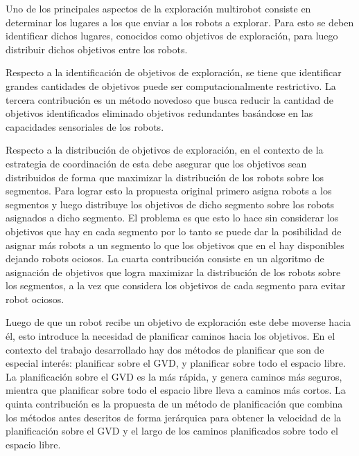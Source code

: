 Uno de los principales aspectos de la exploración multirobot consiste en
determinar los lugares a los que enviar a los robots a explorar. Para esto se
deben identificar dichos lugares, conocidos como objetivos de exploración, para
luego distribuir dichos objetivos entre los robots.

Respecto a la identificación de objetivos de exploración, se tiene que
identificar grandes cantidades de objetivos puede ser computacionalmente
restrictivo. La tercera contribución es un método novedoso que busca reducir la
cantidad de objetivos identificados eliminado objetivos redundantes basándose en
las capacidades sensoriales de los robots. 

Respecto a la distribución de objetivos de exploración, en el contexto de la
estrategia de coordinación de \cite{wurm2008coordinated} esta debe asegurar que
los objetivos sean distribuidos de forma que maximizar la distribución de los
robots sobre los segmentos. Para lograr esto la propuesta original primero
asigna robots a los segmentos y luego distribuye los objetivos de dicho segmento
sobre los robots asignados a dicho segmento. El problema es que esto lo hace sin
considerar los objetivos que hay en cada segmento por lo tanto se puede dar la
posibilidad de asignar más robots a un segmento lo que los objetivos que en el
hay disponibles dejando robots  ociosos. La cuarta contribución consiste en un
algoritmo de asignación de objetivos que logra maximizar la distribución de los
robots sobre los segmentos, a la vez que considera los objetivos de cada
segmento para evitar robot ociosos.

Luego de que un robot recibe un objetivo de exploración este debe moverse hacia
él, esto introduce la necesidad de planificar caminos hacia los objetivos. En el
contexto del trabajo desarrollado hay dos métodos de planificar que son de
especial interés: planificar sobre el GVD, y planificar sobre todo el espacio
libre. La planificación sobre el GVD es la más rápida, y genera caminos más
seguros, mientra que planificar sobre todo el espacio libre lleva a caminos más
cortos. La quinta contribución es la propuesta de un método de planificación
que combina los métodos antes descritos de forma jerárquica para obtener la
velocidad de la planificación sobre el GVD y el largo de los caminos
planificados sobre todo el espacio libre.




